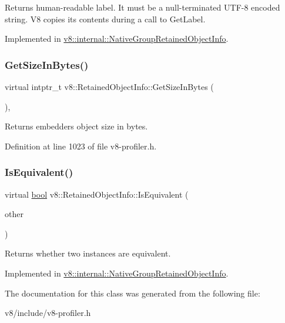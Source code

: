 Returns human-\/readable label. It must be a null-\/terminated U\+T\+F-\/8 encoded string. V8 copies its contents during a call to Get\+Label. 

Implemented in \mbox{\hyperlink{classv8_1_1internal_1_1NativeGroupRetainedObjectInfo_a8b9d63379a9e6647ecbe169d6f9223ee}{v8\+::internal\+::\+Native\+Group\+Retained\+Object\+Info}}.

\mbox{\label{classv8_1_1RetainedObjectInfo_a1a899eed0b1f6e046edc3c7a7c08aa8c}} 
\subsubsection{\texorpdfstring{Get\+Size\+In\+Bytes()}{GetSizeInBytes()}}
{\footnotesize\ttfamily virtual intptr\+\_\+t v8\+::\+Retained\+Object\+Info\+::\+Get\+Size\+In\+Bytes (\begin{DoxyParamCaption}{ }\end{DoxyParamCaption})\hspace{0.3cm}{\ttfamily [inline]}, {\ttfamily [virtual]}}

Returns embedder\textquotesingle{}s object size in bytes. 

Definition at line 1023 of file v8-\/profiler.\+h.

\mbox{\label{classv8_1_1RetainedObjectInfo_a286103bb076c85415919c86b1838c990}} 
\subsubsection{\texorpdfstring{Is\+Equivalent()}{IsEquivalent()}}
{\footnotesize\ttfamily virtual \mbox{\hyperlink{classbool}{bool}} v8\+::\+Retained\+Object\+Info\+::\+Is\+Equivalent (\begin{DoxyParamCaption}\item[{\mbox{\hyperlink{classv8_1_1RetainedObjectInfo}{Retained\+Object\+Info}} $\ast$}]{other }\end{DoxyParamCaption})\hspace{0.3cm}{\ttfamily [pure virtual]}}

Returns whether two instances are equivalent. 

Implemented in \mbox{\hyperlink{classv8_1_1internal_1_1NativeGroupRetainedObjectInfo_a8d54367b99192c9081d03ccdc8e97612}{v8\+::internal\+::\+Native\+Group\+Retained\+Object\+Info}}.



The documentation for this class was generated from the following file\+:\begin{DoxyCompactItemize}
\item 
v8/include/v8-\/profiler.\+h\end{DoxyCompactItemize}

